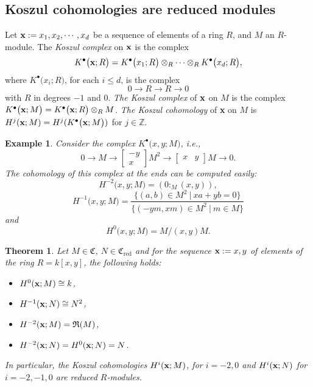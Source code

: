 \documentclass[12pt,a4paper]{article}
\newcommand{\noi}{\noindent}
\newtheorem{thm}{Theorem}[section]
\newtheorem{ex}{Example}[section]
\begin{document}
		\subsection{Koszul cohomologies are reduced modules}
		\begin{paragraph}\noi
			Let ${\bf x}:=x_1, x_2, \cdots, x_d$ be a sequence of elements of a ring $R$, and $M$ an $R$-module. The {\it Koszul complex} on ${\bf x}$ is the complex
			$$K^{\bullet}\big({\bf x} ; R \big)=K^{\bullet}\big(x_1 ; R \big) \otimes _R \cdots \otimes_R K^{\bullet}\big(x_d ; R \big),$$
			where $K^{\bullet}\big(x_i ; R \big)$, for each $i\leq d$, is the complex
			$$0 \longrightarrow R\longrightarrow R \longrightarrow 0$$
			with $R$ in degrees $-1$ and $0$. {\it The Koszul complex} of $\bf x$ on $M$ is the complex $K^{\bullet}\big({\bf x} ; M \big)=K^{\bullet}\big({\bf x} ; R \big) \otimes _R M$. {\it The Koszul cohomology} of {\bf x} on $M$ is $H^j({\bf x} ; M)=H^j(K^{\bullet}\big({\bf x} ; M \big))$ for $j \in \mathbb{Z}$. 
			\begin{ex} \rm {\cite{iyengar2007twenty}}
				Consider the complex $K^{\bullet}\big(x, y ; M \big)$, i.e., $$0 \longrightarrow M \longrightarrow{\begin{bmatrix}
						-y\\x
				\end{bmatrix}} M^2 \longrightarrow{\begin{bmatrix}
						x & y
				\end{bmatrix}} M\longrightarrow 0.$$ The cohomology of this complex at the ends can be computed easily: 
				$$H^{-2}\big(x, y ; M \big)= (0 : _M(x, y)),$$ $$H^{-1}\big(x, y ; M \big)= \frac{\{(a, b)\in M^2~|~xa+yb=0\}}{\{(-ym, xm)\in M^2~|~m\in M\}}$$ and $$H^0 \big(x, y ; M \big)= M/(x, y)M.$$
			\end{ex}
		\end{paragraph}
		\begin{thm}
			\normalfont
			Let $M\in \mathfrak{C}$, $N \in \mathfrak{C}_\text{red}$ and for the sequence ${\bf x}:=x, y$ of elements of the ring $R=k[x, y]$, the following holds:
			\begin{itemize}
				\item [1.] $H^0({\bf x} ; M)\cong k$,
				\item [2.] $H^{-1}({\bf x} ; N)\cong N^2$,
				\item [3.] $H^{-2}({\bf x} ; M)=\mathfrak{R}(M)$,
				\item [4.] $H^{-2}({\bf x} ; N)=H^0({\bf x} ; N)=N$. 
			\end{itemize}
			In particular, the Koszul cohomologies $H^i({\bf x} ; M)$, for $i=-2, 0$ and
			$H^i({\bf x}; N )$ for $i=-2, -1, 0$ are reduced $R$-modules.
		\end{thm}
\end{document}
